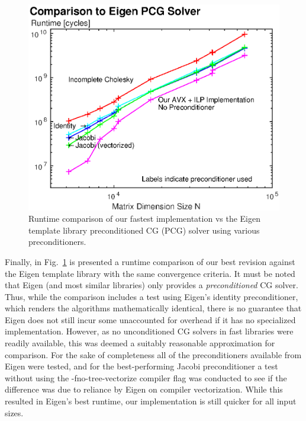 \documentclass[letterpaper]{article}
\begin{document}
\begin{figure}\centering
  \includegraphics[scale=0.67]{./plots/runtime_vs_Eigen.eps}
  \caption{Runtime comparison of our fastest implementation vs the Eigen template library preconditioned CG (PCG) solver using various preconditioners.\label{runtime_vs_Eigen}}
\end{figure}

Finally, in Fig.~\ref{runtime_vs_Eigen} is presented a runtime comparison of our best revision against the Eigen template library with the same convergence criteria. It must be noted that Eigen (and most similar libraries) only provides a \emph{preconditioned} CG solver. Thus, while the comparison includes a test using Eigen's identity preconditioner, which renders the algorithms mathematically identical, there is no guarantee that Eigen does not still incur some unaccounted for overhead if it has no specialized implementation. However, as no unconditioned CG solvers in fast libraries were readily available, this was deemed a suitably reasonable approximation for comparison. For the sake of completeness all of the preconditioners available from Eigen were tested, and for the best-performing Jacobi preconditioner a test without using the -fno-tree-vectorize compiler flag was conducted to see if the difference was due to reliance by Eigen on compiler vectorization. While this resulted in Eigen's best runtime, our implementation is still quicker for all input sizes.

\end{document}
